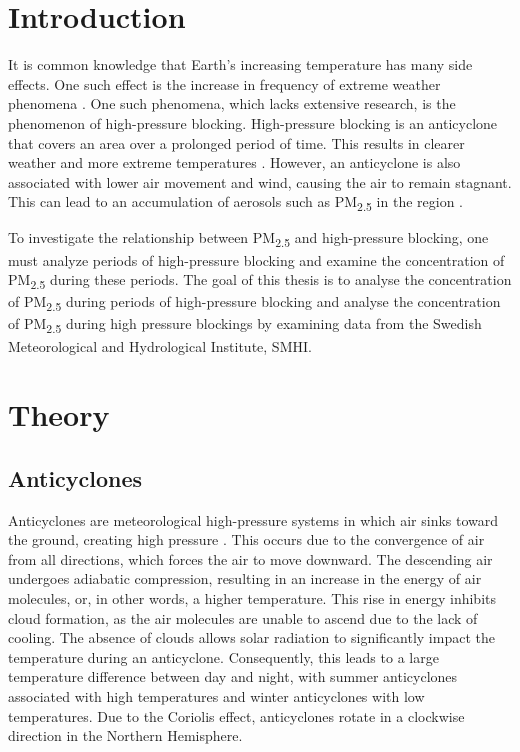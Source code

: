 \section{Introduction}
It is common knowledge that Earth's increasing temperature has many side effects. One such effect is the increase in frequency of extreme weather phenomena \cite{Mitchell2006}. One such phenomena, which lacks extensive research, is the phenomenon of high-pressure blocking. High-pressure blocking is an anticyclone that covers an area over a prolonged period of time. This results in clearer weather and more extreme temperatures \cite{Lupo2020}. However, an anticyclone is also associated with lower air movement and wind, causing the air to remain stagnant. This can lead to an accumulation of aerosols such as PM\textsubscript{2.5} in the region \cite{Cai2020}.

To investigate the relationship between PM\textsubscript{2.5} and high-pressure blocking, one must analyze periods of high-pressure blocking and examine the concentration of PM\textsubscript{2.5} during these periods. The goal of this thesis is to analyse the concentration of PM\textsubscript{2.5} during periods of high-pressure blocking and analyse the concentration of PM\textsubscript{2.5} during high pressure blockings by examining data from the Swedish Meteorological and Hydrological Institute, SMHI. 

\section{Theory}
\subsection{Anticyclones}
Anticyclones are meteorological high-pressure systems in which air sinks toward the ground, creating high pressure \cite{SpiridonovCuric2021}. This occurs due to the convergence of air from all directions, which forces the air to move downward. The descending air undergoes adiabatic compression, resulting in an increase in the energy of air molecules, or, in other words, a higher temperature. This rise in energy inhibits cloud formation, as the air molecules are unable to ascend due to the lack of cooling. The absence of clouds allows solar radiation to significantly impact the temperature during an anticyclone. Consequently, this leads to a large temperature difference between day and night, with summer anticyclones associated with high temperatures and winter anticyclones with low temperatures. Due to the Coriolis effect, anticyclones rotate in a clockwise direction in the Northern Hemisphere.

